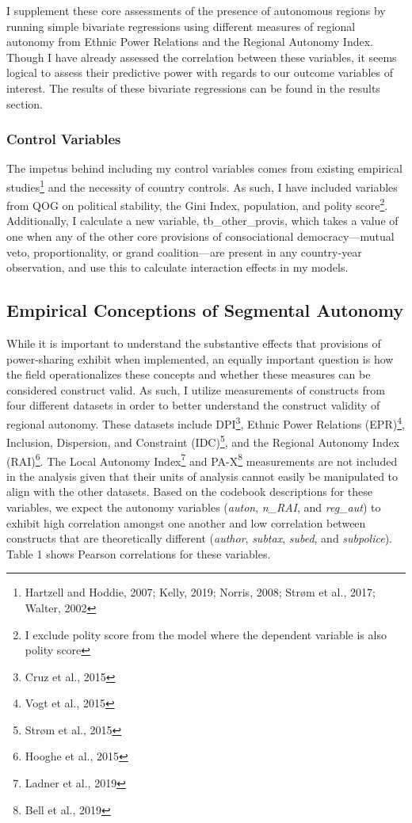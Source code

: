 \documentclass[12pt]{article}
\begin{document}
\doublespacing
I supplement these core assessments of the presence of autonomous regions by running simple bivariate regressions using different measures of regional autonomy from Ethnic Power Relations and the Regional Autonomy Index. Though I have already assessed the correlation between these variables, it seems logical to assess their predictive power with regards to our outcome variables of interest. The results of these bivariate regressions can be found in the results section. 

\subsubsection{Control Variables} 
The impetus behind including my control variables comes from existing empirical studies\footnote{Hartzell and Hoddie, 2007; Kelly, 2019; Norris, 2008; Strøm et al., 2017; Walter, 2002} and the necessity of country controls. As such, I have included variables from QOG on political stability, the Gini Index, population, and polity score\footnote{I exclude polity score from the model where the dependent variable is also polity score}. Additionally, I calculate a new variable, tb\_other\_provis, which takes a value of one when any of the other core provisions of consociational democracy---mutual veto, proportionality, or grand coalition---are present in any country-year observation, and use this to calculate interaction effects in my models. 

\subsection{Empirical Conceptions of Segmental Autonomy}
While it is important to understand the substantive effects that provisions of power-sharing exhibit when implemented, an equally important question is how the field operationalizes these concepts and whether these measures can be considered construct valid. As such, I utilize measurements of constructs from four different datasets in order to better understand the construct validity of regional autonomy. These datasets include DPI\footnote{Cruz et al., 2015}, Ethnic Power Relations (EPR)\footnote{Vogt et al., 2015}, Inclusion, Dispersion, and Constraint (IDC)\footnote{Strøm et al., 2015}, and the Regional Autonomy Index (RAI)\footnote{Hooghe et al., 2015}. The Local Autonomy Index\footnote{Ladner et al., 2019} and PA-X\footnote{Bell et al., 2019} measurements are not included in the analysis given that their units of analysis cannot easily be manipulated to align with the other datasets. Based on the codebook descriptions for these variables, we expect the autonomy variables (\textit{auton}, \textit{n\_RAI}, and \textit{reg\_aut}) to exhibit high correlation amongst one another and low correlation between constructs that are theoretically different (\textit{author}, \textit{subtax}, \textit{subed}, and \textit{subpolice}). Table 1 shows Pearson correlations for these variables.
\end{document}
